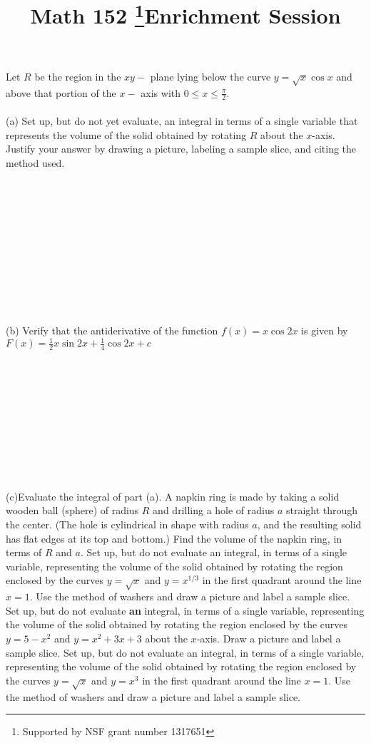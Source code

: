 \documentclass[11pt]{exam}
\title{\vspace{-50pt}
 \Huge \name
\\
\vspace{10pt}
\huge Math 152 \thanks{Supported by NSF grant number 1317651 }\hfill Enrichment Session  \hw}
\author{}
\date{}
\theoremstyle{quest}
\begin{document}
\maketitle
\begin{questions}
\bracketedpoints
\question[10=4+3+3] 
Let $R$ be the region in the $xy-$ plane lying below the curve $y=\sqrt{x}\cos x$ and above that portion of the $x-$ axis with
$0\leq x\leq \frac{\pi}{2}$.
\\\\
(a) Set up, but do not yet evaluate, an integral in terms of a single variable that represents the volume
of the solid obtained by rotating $R$ about the $x$-axis. Justify your answer by drawing a picture,
labeling a sample slice, and citing the method used.
\\\\\\\\\\\\\\\\\\\\\\\\
(b) Verify that the antiderivative of the function $f(x)=x\cos 2x$ is given by $F(x)=\frac{1}{2}x\sin 2x+\frac{1}{4}\cos 2x+c$
\\\\\\\\\\\\\\\\\\\\\\
(c)Evaluate the integral of part (a).
\newpage
\question[10]
A napkin ring is made by taking a solid wooden ball (sphere) of radius $R$ and drilling a
hole of radius $a$ straight through the center. (The hole is cylindrical in shape with radius $a$, and the
resulting solid has flat edges at its top and bottom.) Find the volume of the napkin ring, in terms of
$R$ and $a$.
\newpage
\question[5]Set up, but do not evaluate an integral,  in terms of a single variable, representing the volume of the solid obtained by rotating the region enclosed by the curves 
 $y=\sqrt{x}$ and $y=x^{1/3}$  in the first quadrant around the line $x=1$. Use the method of washers and draw a picture and label a sample slice.
\newpage
\question[5] Set up, but do not evaluate {\bf an} integral,  in terms of a single variable, representing the volume of the solid obtained by rotating the region enclosed by the curves 
 $y=5-x^2$ and $y=x^2+3x+3$  about the $x$-axis. Draw a picture and label a sample slice.
\newpage
\question[5] Set up, but do not evaluate an integral,  in terms of a single variable, representing the volume of the solid obtained by rotating the region enclosed by the curves 
 $y=\sqrt{x}$ and $y=x^3$  in the first quadrant around the line $x=1$. Use the method of washers and draw a picture and label a sample slice.
\end{questions}
\end{document}
